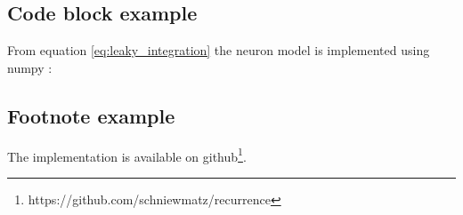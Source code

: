 \subsection{Code block example}
From equation \ref{eq:leaky_integration} the neuron model is implemented using numpy \citep{harris:2020}:



\subsection{Footnote example}
The implementation is available on github\footnote{https://github.com/schniewmatz/recurrence}.